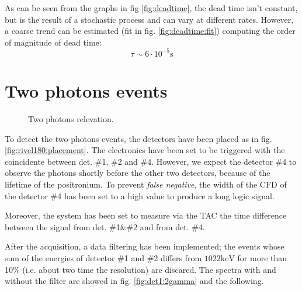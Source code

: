 \documentclass[11pt,a4 paper]{article}
\begin{document}
As can be seen from the graphs in fig \ref{fig:deadtime}, the dead time isn't constant, but is the result of a stochastic process and can vary at different rates. However, a coarse trend can be estimated (fit in fig. \ref{fig:deadtime:fit}) computing the order of magnitude of dead time:
\begin{equation*}
    \tau \sim 6\cdot10^{-5} \si{\second}
\end{equation*}



\section{Two photons events}

\begin{figure}[H]
    \centering
    { \label{fig:rivel180:placement}} \quad
    {}
    \caption{Two photons relevation.}
    \label{fig:rivel180}
\end{figure}

To detect the two-photons events, the detectors have been placed as in fig. \ref{fig:rivel180:placement}. The electronics have been set to be triggered with the coincidente between det. \#1, \#2 and \#4. However, we expect the detector \#4 to observe the photons shortly before the other two detectors, because of the lifetime of the positronium. To prevent \emph{false negative}, the width of the CFD of the detector \#4 has been set to a high value to produce a long logic signal.

Moreover, the system has been set to measure via the TAC the time difference between the signal from det. \#1\&\#2 and from det. \#4.

After the acquisition, a data filtering has been implemented; the events whose sum of the energies of detector \#1 and \#2 differs from $1022\si{\kilo\electronvolt}$ for more than 10\% (i.e. about two time the resolution) are discared. The spectra with and without the filter are showed in fig. \ref{fig:det1:2gamma} and the following.

\end{document}
